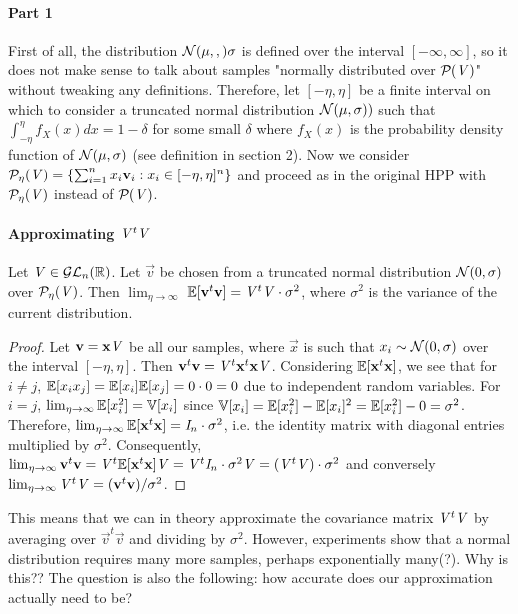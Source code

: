 \paragraph{Part 1}
First of all, the distribution $\normdist{\mu},{\sigma}$ is defined over the interval $[- \infty, \infty]$, so it does not make sense to talk about samples "normally distributed over $\PP{V}$" without tweaking any definitions.
Therefore, let $[- \eta, \eta]$ be a finite interval on which to consider a truncated normal distribution $\normdist{\mu}{\sigma})$ such that $\int_{-\eta}^{\eta} f_X(x) dx = 1 - \delta$ for some small $\delta$
where $f_X(x)$ is the probability density function of $\normdist{\mu}{\sigma}$ (see definition in section 2).
Now we consider $\PP[\eta]{V} = \{\sum_{i=1}^n x_i \vec{v}_i : x_i \in [-\eta, \eta]^n\}$ and proceed as in the original HPP with $\PP[\eta]{V}$ instead of $\PP{V}$.

\paragraph{Approximating $\mat{V}^t \mat{V}$}
Let $\mat{V} \in \GLnR$. Let $\vec{v}$ be chosen from a truncated normal distribution $\normdist{0}{\sigma}$ over $\PP[\eta]{V}$.
Then $\lim_{\eta\to\infty}$ $\bb{E}[\vec{v}^t\vec{v}] = \mat{V}^t \mat{V} \cdot \sigma^2$, where $\sigma^2$ is the variance of the current distribution.

\begin{proof}
    Let $\vec{v} = \vec{x}\mat{V}$ be all our samples, where $\vec{x}$ is such that $x_i \sim \normdist{0}{\sigma}$ over the interval $[-\eta, \eta]$.
Then $\vec{v}^t\vec{v} = \mat{V}^t \vec{x}^t \vec{x} \mat{V}$. Considering $\bb{E}[\vec{x}^t \vec{x}]$, we see that for $i \neq j$, 
$\bb{E}[x_i x_j] = \bb{E}[x_i] \bb{E}[x_j] = 0 \cdot 0 = 0$ due to independent random variables.
For $i=j$, $\lim_{\eta\to\infty} \bb{E}[x_i^2] = \bb{V}[x_i]$ since $\bb{V}[x_i] = \bb{E}[x_i^2] - \bb{E}[x_i]^2 = \bb{E}[x_i^2] - 0 = \sigma ^2$.
Therefore, $\lim_{\eta\to\infty} \bb{E}[\vec{x}^t \vec{x}] = \mat{I}_n \cdot \sigma^2$, i.e. the identity matrix with diagonal entries multiplied by $\sigma ^2$.
Consequently, $\lim_{\eta\to\infty} \vec{v}^t \vec{v} = \mat{V}^t \bb{E}[\vec{x}^t\vec{x}] \mat{V} = \mat{V}^t \mat{I}_n \cdot \sigma^2 \mat{V} = (\mat{V}^t \mat{V}) \cdot \sigma ^2$ 
and conversely $\lim_{\eta\to\infty} \mat{V}^t \mat{V} = (\vec{v}^t \vec{v})/ \sigma^2$.
\end{proof}

This means that we can in theory approximate the covariance matrix $\mat{V}^t \mat{V}$ by averaging over $\vec{v}^t \vec{v}$ and dividing by $\sigma ^2$. 
However, experiments show that a normal distribution requires many more samples, perhaps exponentially many(?). Why is this??
The question is also the following: how accurate does our approximation actually need to be?
